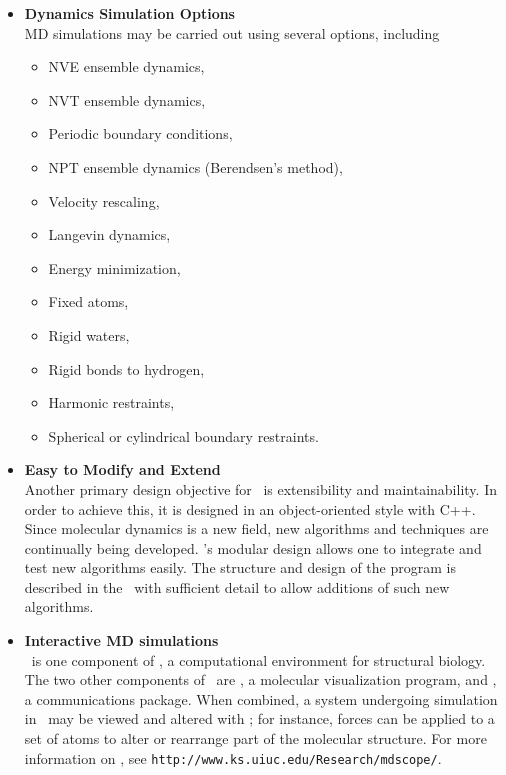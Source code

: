 \begin{itemize}
\item{\bf Dynamics Simulation Options}\\
MD simulations may be carried out using several options, including
\begin{itemize}
  \item NVE ensemble dynamics,
  \item NVT ensemble dynamics,
  \item Periodic boundary conditions,
  \item NPT ensemble dynamics (Berendsen's method),
  \item Velocity rescaling,
  \item Langevin dynamics,
  \item Energy minimization,
  \item Fixed atoms,
  \item Rigid waters,
  \item Rigid bonds to hydrogen,
  \item Harmonic restraints,
  \item Spherical or cylindrical boundary restraints.
\end{itemize}

\item{\bf Easy to Modify and Extend}\\
Another primary design objective for \NAMD\ is extensibility and 
maintainability. In order to achieve this, it is designed in an 
object-oriented style with C++. Since molecular dynamics is a new field,
new algorithms and techniques are continually being developed.
\NAMD's modular design allows one to integrate and test new algorithms 
easily.  The structure and design of the program 
is described in the \PG\ with sufficient
detail to allow additions of such
new algorithms.

\item{\bf Interactive MD simulations}\\
\NAMD\ is one component of \ALLNAMES, a computational environment for
structural biology.  The two other components of \ALLNAMES\ are \VMD,
a molecular visualization program, and \MDCOMM, a communications package.
When combined, a system undergoing simulation in \NAMD\ may be viewed and
altered with \VMD; for instance, forces can be applied to a set of atoms
to alter or rearrange part of the molecular structure.  For more information
on \ALLNAMES, see {\tt http://www.ks.uiuc.edu/Research/mdscope/}.  


\end{itemize}
